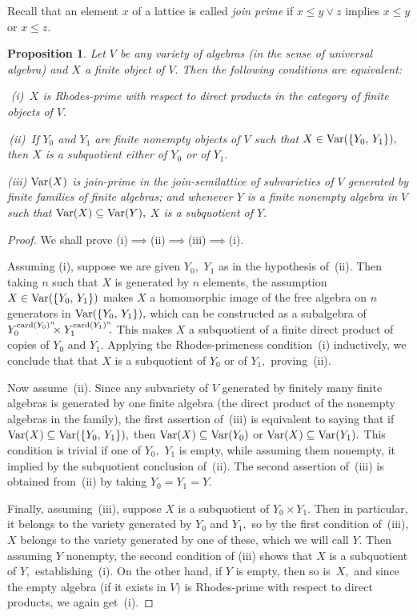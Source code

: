 \documentclass{amsart}
\newtheorem{proposition}[theorem]{Proposition}
\numberwithin{equation}{section}
\numberwithin{theorem}{section}
\begin{document}
Recall that an element $x$ of a lattice is called
{\em join prime} if $x\leq y\vee z$ implies
$x\leq y$ or $x\leq z.$

\begin{proposition}\label{P.Rprime&var}
Let $V$ be any variety of algebras \textup{(}in the sense
of universal algebra\textup{)} and $X$ a finite object of $V.$
Then the following conditions are equivalent:

\,\,{\rm(i)}\, $X$ is Rhodes-prime with respect to direct
products in the category of finite objects of $V.$

\,{\rm(ii)}\, If $Y_0$ and $Y_1$ are finite nonempty
objects of $V$ such that
$X\in\textup{Var}(\{Y_0,\,Y_1\}),$ then $X$ is a subquotient either
of $Y_0$ or of $Y_1.$

{\rm(iii)} $\textup{Var}(X)$ is join-prime in the join-semilattice of
subvarieties of $V$ generated by finite families
of finite algebras; and
whenever $Y$ is a finite nonempty algebra in $V$ such that
$\textup{Var}(X) \subseteq\textup{Var}(Y),$ $X$ is a subquotient of $Y.$
\end{proposition}

\begin{proof}

We shall prove (i)$\implies$(ii)$\implies$(iii)$\implies$(i).

Assuming (i), suppose we are given $Y_0,$ $Y_1$ as in
the hypothesis of~(ii).
Then taking $n$ such that $X$ is generated by $n$
elements, the assumption $X\in\textup{Var}(\{Y_0,\,Y_1\})$ makes
$X$ a homomorphic image of the free algebra on $n$ generators in
$\textup{Var}(\{Y_0,\,Y_1\}),$ which can be
constructed as a subalgebra of
$Y_0^{\textup{card}(Y_0)^n}\!\!\!\times Y_1^{\textup{card}(Y_1)^n}\!\!.$
This makes $X$ a
subquotient of a finite direct product of copies of $Y_0$ and $Y_1.$
Applying the Rhodes-primeness condition~(i) inductively, we
conclude that that $X$ is a subquotient of $Y_0$ or of $Y_1,$
proving~(ii).

Now assume~(ii).
Since any subvariety of $V$ generated by finitely many finite
algebras is generated by one finite algebra (the direct product of the
nonempty algebras in the family), the first assertion of~(iii) is
equivalent to saying
that if $\textup{Var}(X)\subseteq\textup{Var}(\{Y_0,\,Y_1\}),$
then $\textup{Var}(X)\subseteq\textup{Var}(Y_0)$
or $\textup{Var}(X)\subseteq\textup{Var}(Y_1).$
This condition is trivial if one of $Y_0,$ $Y_1$ is empty,
while assuming them nonempty, it implied by the subquotient
conclusion of~(ii).
The second assertion of~(iii) is obtained from~(ii) by
taking $Y_0=Y_1=Y.$

Finally, assuming~(iii), suppose $X$ is a subquotient of
$Y_0\times Y_1.$
Then in particular, it belongs to the variety
generated by $Y_0$ and $Y_1,$
so by the first condition of~(iii), $X$ belongs
to the variety generated by one of these, which we will call $Y.$
Then assuming $Y$ nonempty, the second condition of (iii) shows
that $X$ is a subquotient of $Y,$ establishing~(i).
On the other hand, if $Y$ is empty, then so is~$X,$
and since the empty algebra (if it exists in $V)$
is Rhodes-prime with respect to direct products, we again get~(i).
\end{proof}
\end{document}
